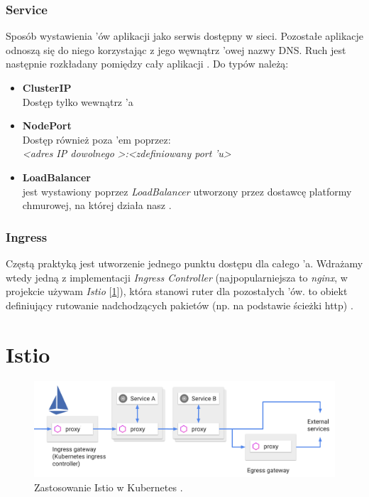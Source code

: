\subsubsection{Service}
Sposób wystawienia 'ów aplikacji jako serwis dostępny w sieci. Pozostałe aplikacje odnoszą się do niego korzystając z jego węwnątrz 'owej nazwy DNS.
Ruch jest następnie rozkładany pomiędzy cały  aplikacji \cite{k8s-cpts}. Do typów  należą: 

\begin{itemize}
    \item
    \textbf{ClusterIP}\\
    Dostęp tylko wewnątrz 'a
    
    \item
    \textbf{NodePort}\\
    Dostęp również poza 'em poprzez:\\ 
    \emph{<adres IP dowolnego }\emph{>:<zdefiniowany port }\emph{'u>}

    \item
    \textbf{LoadBalancer}\\
     jest wystawiony poprzez \emph{LoadBalancer} utworzony przez dostawcę platformy chmurowej, na której działa nasz .
\end{itemize} 


\subsubsection{Ingress}
Częstą praktyką jest utworzenie jednego punktu dostępu dla całego ’a. 
Wdrażamy wtedy jedną z implementacji \emph{Ingress Controller} (najpopularniejsza to \emph{nginx}, w projekcie używam \emph{Istio} [\ref{istio}]), która stanowi ruter dla pozostałych ’ów. 
 to obiekt definiujący rutowanie nadchodzących pakietów (np. na podstawie ścieżki http) \cite{k8s-cpts}.


\section{Istio}
\label{istio}

\begin{figure}[!ht]
	\begin{center}
		\includegraphics[width=1\textwidth]{img/istio}
	\end{center}
	\caption{Zastosowanie Istio w Kubernetes \cite{istio-traffic}.}
\end{figure}

